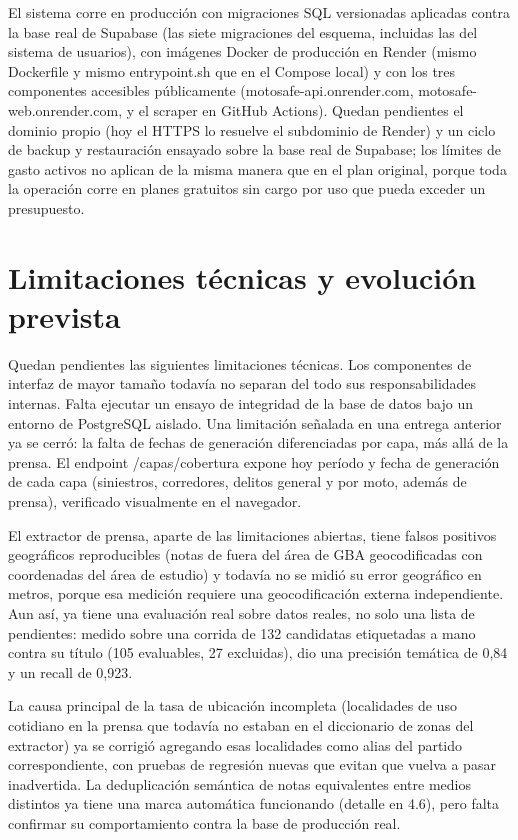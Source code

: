 El sistema corre en producción con migraciones SQL versionadas aplicadas
contra la base real de Supabase (las siete migraciones del esquema,
incluidas las del sistema de usuarios), con imágenes Docker de
producción en Render (mismo Dockerfile y mismo entrypoint.sh que en el
Compose local) y con los tres componentes accesibles públicamente
(motosafe-api.onrender.com, motosafe-web.onrender.com, y el scraper en
GitHub Actions). Quedan pendientes el dominio propio (hoy el HTTPS lo
resuelve el subdominio de Render) y un ciclo de backup y restauración
ensayado sobre la base real de Supabase; los límites de gasto activos no
aplican de la misma manera que en el plan original, porque toda la
operación corre en planes gratuitos sin cargo por uso que pueda exceder
un presupuesto.

\section{Limitaciones técnicas y evolución prevista}

Quedan pendientes las siguientes limitaciones técnicas. Los componentes
de interfaz de mayor tamaño todavía no separan del todo sus
responsabilidades internas. Falta ejecutar un ensayo de integridad de la
base de datos bajo un entorno de PostgreSQL aislado. Una limitación
señalada en una entrega anterior ya se cerró: la falta de fechas de
generación diferenciadas por capa, más allá de la prensa. El endpoint
/capas/cobertura expone hoy período y fecha de generación de cada capa
(siniestros, corredores, delitos general y por moto, además de prensa),
verificado visualmente en el navegador.

El extractor de prensa, aparte de las limitaciones abiertas, tiene
falsos positivos geográficos reproducibles (notas de fuera del área de
GBA geocodificadas con coordenadas del área de estudio) y todavía no se
midió su error geográfico en metros, porque esa medición requiere una
geocodificación externa independiente. Aun así, ya tiene una evaluación
real sobre datos reales, no solo una lista de pendientes: medido sobre
una corrida de 132 candidatas etiquetadas a mano contra su título (105
evaluables, 27 excluidas), dio una precisión temática de 0,84 y un
recall de 0,923.

La causa principal de la tasa de ubicación incompleta (localidades de
uso cotidiano en la prensa que todavía no estaban en el diccionario de
zonas del extractor) ya se corrigió agregando esas localidades como
alias del partido correspondiente, con pruebas de regresión nuevas que
evitan que vuelva a pasar inadvertida. La deduplicación semántica de
notas equivalentes entre medios distintos ya tiene una marca automática
funcionando (detalle en 4.6), pero falta confirmar su comportamiento
contra la base de producción real.

